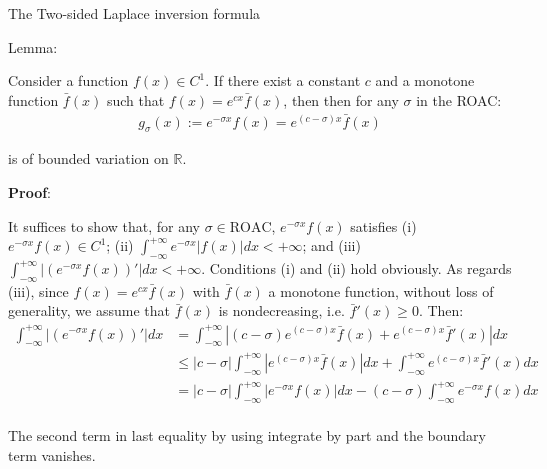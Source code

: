 \documentclass{beamer}
\begin{document}
\begin{frame}{The Two-sided Laplace inversion formula}


    {\footnotesize \scriptsize
    \par Lemma: 
    \par Consider a function \( f(x) \in C^1 \). If there exist
     a constant \( c \) and a monotone function \( \bar{f}(x) \) such that \( f(x) = e^{cx} \bar{f}(x) \), then 
     then for any \(\sigma\) in the ROAC:
     \begin{align*}
        g_{\sigma}(x) := e^{-\sigma x} f(x) = e^{(c - \sigma)x} \bar{f}(x)
     \end{align*}
     \par is of bounded variation on \(\mathbb{R}\).
     \par \textbf{Proof}:
     \par It suffices to show that, for any \(\sigma \in \text{ROAC}\), \(e^{-\sigma x} f(x)\) 
     satisfies (i) \(e^{-\sigma x} f(x) \in C^1\); (ii) \(\int_{-\infty}^{+\infty} e^{-\sigma x} |f(x)|  dx < +\infty\); 
     and (iii) \(\int_{-\infty}^{+\infty} |(e^{-\sigma x} f(x))'|  dx < +\infty\). Conditions (i) and (ii) hold obviously. 
     As regards (iii), since \(f(x) = e^{cx} \bar{f}(x)\) with \(\bar{f}(x)\) a monotone function, 
     without loss of generality, we assume that \(\bar{f}(x)\) is nondecreasing, i.e. \(\bar{f}'(x) \geq 0\). Then:
     \begin{align*}
        \int_{-\infty}^{+\infty} |(e^{-\sigma x} f(x))'|  dx 
        & = \int_{-\infty}^{+\infty} |(c - \sigma) e^{(c - \sigma)x} \bar{f}(x) + e^{(c - \sigma)x} \bar{f}'(x)|  dx\\
        &\leq |c - \sigma| \int_{-\infty}^{+\infty} |e^{(c - \sigma)x} \bar{f}(x)|  dx + \int_{-\infty}^{+\infty} e^{(c - \sigma)x} \bar{f}'(x)  dx\\
        &= |c - \sigma| \int_{-\infty}^{+\infty} |e^{-\sigma x} f(x)|  dx - (c - \sigma) \int_{-\infty}^{+\infty} e^{-\sigma x} f(x)  dx\\
     \end{align*}
         \vspace{-3em}
      \par The second term in last equality by using integrate by part and the boundary term vanishes.
 
    }
    
\end{frame}
\end{document}
